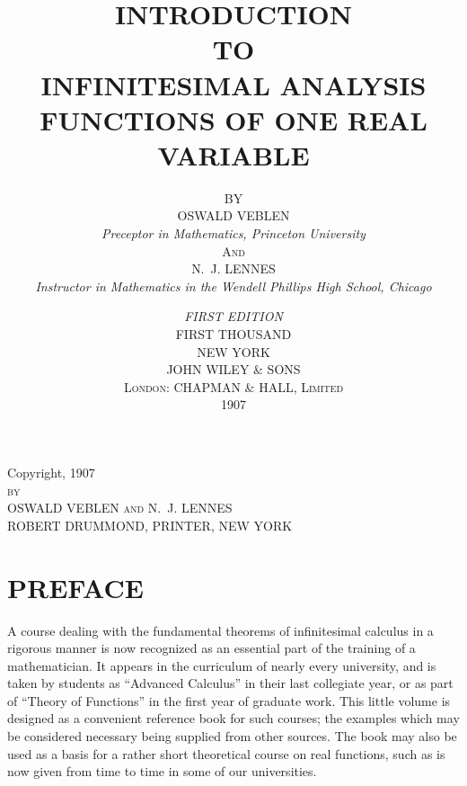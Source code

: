 \documentclass[a4paper,12pt]{book}[2004/02/16]
\providecommand{\pdfbookmark}[3][0]{}
\theoremstyle{ilemma}
\theoremstyle{itheorem}
\theoremstyle{iother}
\theoremstyle{icorollary}
\theoremstyle{numcorollary}
\theoremstyle{idefinition}
\begin{document}
%
%
%
%
\title{\label{titlepage}\pdfbookmark[0]{Title Page.}{titlepage}%
INTRODUCTION\\
{\small TO}\\
{\Huge INFINITESIMAL ANALYSIS\\[1ex]}
{\Large FUNCTIONS OF ONE REAL VARIABLE}
}

\author{{\small BY}\\
OSWALD VEBLEN\\
\textit{Preceptor in Mathematics, Princeton University}\\
{\small \textsc{And}}\\
N.~J. LENNES\\
\textit{Instructor in Mathematics in the Wendell Phillips High School, Chicago}
}
\date{%
\textit{FIRST EDITION}\\
{\small FIRST THOUSAND}\\
\vspace{0.2\textheight}
NEW YORK\\
JOHN WILEY \& SONS\\
\textsc{London: CHAPMAN \& HALL, Limited}\\
1907
}
\maketitle
\begin{center}
\vspace*{0.4\textheight}
Copyright, 1907\\
\textsc{by\\
OSWALD VEBLEN and N.~J. LENNES\\}
\vfill
ROBERT DRUMMOND, PRINTER, NEW YORK
\end{center}
\newpage




\chapter*{PREFACE}


A course dealing with the fundamental theorems of infinitesimal
calculus in a rigorous manner is now recognized as an
essential part of the training of a mathematician. It appears
in the curriculum of nearly every university, and is taken by
students as ``Advanced Calculus'' in their last collegiate year,
or as part of ``Theory of Functions'' in the first year of graduate
work. This little volume is designed as a convenient reference
book for such courses; the examples which may be considered
necessary being supplied from other sources. The book may
also be used as a basis for a rather short theoretical course on
real functions, such as is now given from time to time in some
of our universities.
\end{document}
